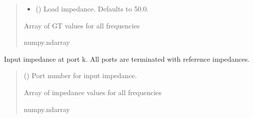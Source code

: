 \documentclass[letterpaper,10pt,english]{sphinxmanual}
\begin{document}
\begin{fulllineitems}
\begin{fulllineitems}
\begin{quote}
\begin{description}
\begin{itemize}
\item {}
\sphinxAtStartPar
{} (\sphinxstyleliteralemphasis{\sphinxupquote{, }}) \textendash{} Load impedance. Defaults to 50.0.

\end{itemize}

\sphinxAtStartPar
Array of GT values for all frequencies

\sphinxAtStartPar
numpy.ndarray

\end{description}\end{quote}

\end{fulllineitems}


\begin{fulllineitems}
\label{\detokenize{touchstone:touchstone.spfile.z_in}}
\pysigstartsignatures
{}
\pysigstopsignatures
\sphinxAtStartPar
Input impedance at port k. All ports are terminated with reference impedances.
\begin{quote}\begin{description}
\sphinxAtStartPar
{} () \textendash{} Port number for input impedance.

\sphinxAtStartPar
Array of impedance values for all frequencies

\sphinxAtStartPar
numpy.ndarray

\end{description}\end{quote}

\end{fulllineitems}



\end{fulllineitems}
\end{document}
